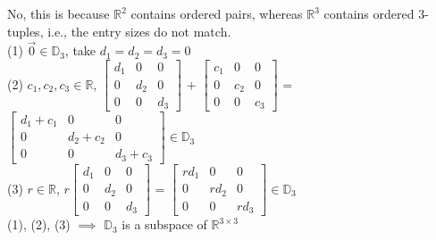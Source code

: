 \documentclass{report}
\begin{document}
\sol
No, this is because $\mathbb{R}^2$ contains ordered pairs, whereas $\mathbb{R}^3$ contains ordered 3-tuples, i.e., the entry sizes do not match. 
\sol \\
(1) $\vec{0} \in \mathbb{D}_3$, take $d_1=d_2=d_3=0$ \\
(2)
 $c_1, c_2, c_3 \in \mathbb{R}$, 
$\begin{bmatrix} d_1 & 0 & 0 \\ 0 & d_2 & 0 \\ 0 & 0 & d_3 \end{bmatrix}$ + 
$\begin{bmatrix} c_1 & 0 & 0 \\ 0 & c_2 & 0 \\ 0 & 0 & c_3 \end{bmatrix}$ = 
$\begin{bmatrix} d_1+c_1 & 0 & 0 \\ 0 & d_2+c_2 & 0 \\ 0 & 0 & d_3+c_3 \end{bmatrix}\in\mathbb{D}_3$ \\
(3) $r \in \mathbb{R}$,
$r\begin{bmatrix} d_1 & 0 & 0 \\ 0 & d_2 & 0 \\ 0 & 0 & d_3 \end{bmatrix}$ =
$\begin{bmatrix} rd_1 & 0 & 0 \\ 0 & rd_2 & 0 \\ 0 & 0 & rd_3 \end{bmatrix}\in\mathbb{D}_3$\\
(1), (2), (3) $\implies$ $\mathbb{D}_3$ is a subspace of $\mathbb{R}^{3 \times 3}$
\end{document}
